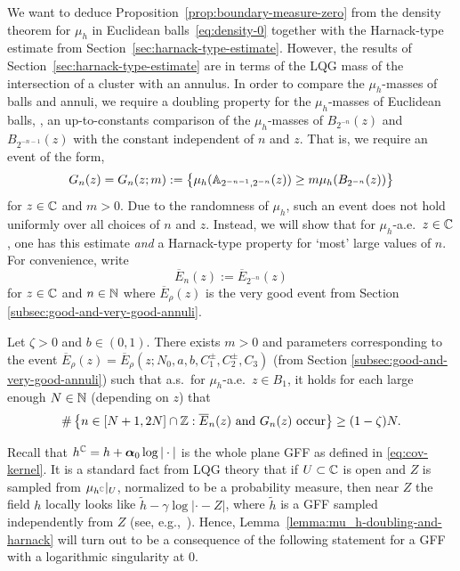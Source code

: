 \documentclass[12pt]{amsart}
\numberwithin{equation}{section}
\begin{document}
	
	We want to deduce Proposition~\ref{prop:boundary-measure-zero} from the density theorem for $\mu_h$ in Euclidean balls~\eqref{eq:density-0}
	together with the Harnack-type estimate from Section~\ref{sec:harnack-type-estimate}. 
	However, the results of Section~\ref{sec:harnack-type-estimate} are in terms of the LQG mass of the intersection of a cluster with an annulus. In order to compare the $\mu_h$-masses of balls and annuli, we require a doubling property for the $\mu_h$-masses of Euclidean balls, \ie, an up-to-constants comparison of the $\mu_h$-masses of $B_{2^{-n}}(z)$ and $B_{2^{-n-1}}(z)$ with the constant independent of $n$ and $z$. That is, we require an event of the form,
	\begin{equation} \label{eq:annulus-ball-comparison}
	G_{n}(z) = G_n(z; m) := \left\{\mu_{h}(\mathbb{A}_{2^{-n-1}, 2^{-n}}(z)) \geq m \mu_{h}(B_{2^{-n}}(z)) \right\}
	\end{equation}
	for $z \in \mathbb{C}$ and $m > 0$. 
	Due to the randomness of $\mu_h$, such an event does not hold uniformly over all choices of $n$ and $z$. Instead, we will show that for $\mu_h$-a.e.\ $z \in \mathbb{C}$, one has this estimate 
	{\it and} a Harnack-type property for `most' large values of $n$. For convenience, write
	\begin{equation} \label{eq:very-good-annuli-event}
	\overline E_{n}(z) := \overline E_{2^{-n}}(z)
	\end{equation}
	for $z \in \mathbb{C}$ and $n \in \mathbb{N}$ where $\overline E_{\rho}(z)$ is the very good event from Section \ref{subsec:good-and-very-good-annuli}.
	
	\begin{lemma} \label{lemma:mu_h-doubling-and-harnack}
		Let $\zeta > 0$ and $b \in (0,1)$. There exists $m > 0$ and parameters corresponding to the event $\overline E_{\rho}(z) = \overline E_{\rho}(z; N_0, a, b, C_1^{\pm}, C_2^{\pm}, C_3)$ (from Section \ref{subsec:good-and-very-good-annuli}) such that a.s.\ for $\mu_h$-a.e.\ $z\in  B_1$, it holds for each large enough $N\in \mathbb{N}$ (depending on $z$) that
		\begin{equation} \label{eq:mu_h-doubling}
		\#\left\{ n \in [N+1,2N] \cap \mathbb{Z} : \mbox{$\overline E_{n}(z)$ and $G_{n}(z)$ occur} \right\}  \geq (1-\zeta) N.
		\end{equation}  
	\end{lemma}
	
	Recall that $h^{\mathbb{C}} = h + \boldsymbol{\alpha}_0 \log |\cdot|$ is the whole plane GFF as defined in \eqref{eq:cov-kernel}. It is a standard fact from LQG theory that if $U\subset  \mathbb{C}$ is open and $Z$ is sampled from $\mu_{h^{\mathbb{C}}}|_U$, normalized to be a probability measure, then near $Z$ the field $h$ locally looks like $\tilde h - \gamma \log |\cdot-Z|$, where $\tilde h$ is a GFF sampled independently from $Z$ (see, e.g.,~\cite[Section 3.3]{duplantier2011liouville}). Hence, Lemma~\ref{lemma:mu_h-doubling-and-harnack} will turn out to be a consequence  of the following statement for a GFF with a logarithmic singularity at 0. 
	
\end{document}
